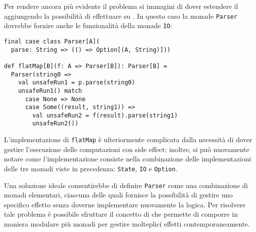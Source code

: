 Per rendere ancora più evidente il problema si immagini di dover estendere il  aggiungendo la possibilità di effettuare  su . In questo caso la monade \lstinline{Parser} dovrebbe fornire anche le funzionalità della monade \lstinline{IO}:
\begin{lstlisting}[language=scala3]
final case class Parser[A](
  parse: String => (() => Option[(A, String)]))

def flatMap[B](f: A => Parser[B]): Parser[B] = 
  Parser(string0 => 
    val unsafeRun1 = p.parse(string0)
    unsafeRun1() match
      case None => None
      case Some((result, string1)) =>
        val unsafeRun2 = f(result).parse(string1)
        unsafeRun2())
\end{lstlisting}
L'implementazione di \lstinline{flatMap} è ulteriormente complicata dalla necessità di dover gestire l'esecuzione delle computazioni con side effect; inoltre, si può nuovamente notare come l'implementazione consiste nella combinazione delle implementazioni delle tre monadi viste in precedenza: \lstinline{State}, \lstinline{IO} e \lstinline{Option}.

Una soluzione ideale consentirebbe di definire \lstinline{Parser} come una combinazione di monadi elementari, ciascuna delle quali fornisce la possibilità di gestire uno specifico effetto senza doverne implementare nuovamente la logica. Per risolvere tale problema è possibile sfruttare il concetto di  che permette di comporre in maniera modulare più monadi per gestire molteplici effetti contemporaneamente.
